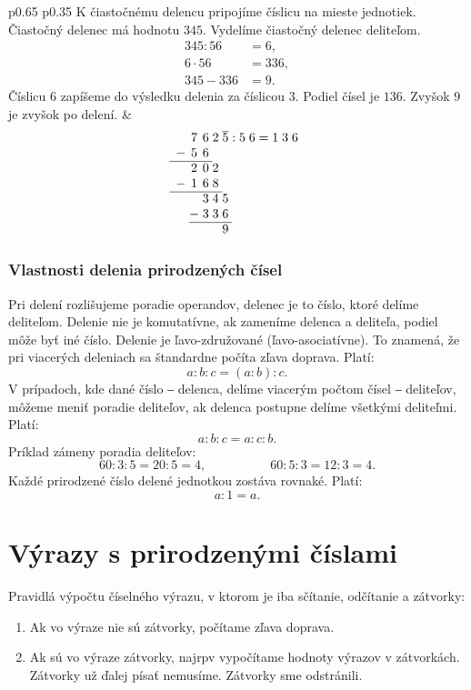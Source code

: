 \documentclass{report}
\begin{document}
\begin{longtable}{p{} p{}}
K čiastočnému delencu pripojíme číslicu na mieste jednotiek. Čiastočný delenec má hodnotu \(345\).
Vydelíme čiastočný delenec deliteľom.
\[
\begin{aligned}
  345 : 56 &= 6, \\
  6 \cdot 56 &= 336, \\
  345 - 336 &= 9.
\end{aligned}
\]
Číslicu \(6\) zapíšeme do výsledku delenia za číslicou \(3\).
Podiel čísel je \(136\). Zvyšok \(9\) je zvyšok po delení.
&
\[
\begin{array}{c@{\;}c@{\;}c@{\;}c@{\;}c@{\;}c@{\;}c@{\;}c@{\;}c@{\;}c@{\;}c@{\;}c}
    & 7 & 6 & 2 & \overline{5} & : & 5 & 6 & = & 1 & 3 & 6 \\
  - & 5 & 6 \\
  \cline{1-3}
    & 2 & 0 & 2 \\
  - & 1 & 6 & 8 \\
  \cline{1-4}
    &   & 3 & 4 & 5 \\
    & - & 3 & 3 & 6\\
  \cline{2-5}
    &   &   &   & 9
\end{array}
\]

\end{longtable}

\subsubsection{Vlastnosti delenia prirodzených čísel}

Pri delení rozlišujeme poradie operandov, delenec je to číslo, ktoré delíme deliteľom. Delenie nie je komutatívne, ak zameníme delenca a deliteľa, podiel môže byť iné číslo. Delenie je ľavo-združované (ľavo-asociatívne). To znamená, že pri viacerých deleniach sa štandardne počíta zľava doprava. Platí:
\[
a : b : c = (a : b) : c.
\]
V prípadoch, kde dané číslo ‒ delenca, delíme viacerým počtom čísel ‒ deliteľov, môžeme meniť poradie deliteľov, ak delenca postupne delíme všetkými deliteľmi. Platí:
\[
a : b : c = a : c : b.
\]
Príklad zámeny poradia deliteľov:
\[
60 : 3 : 5 = 20 : 5 = 4, \hspace{5em} 60 : 5 : 3 = 12 : 3 = 4.
\]
Každé prirodzené číslo delené jednotkou zostáva rovnaké. Platí:
\[
a : 1 = a.
\]

\section{Výrazy s prirodzenými číslami}

Pravidlá výpočtu číselného výrazu, v ktorom je iba sčítanie, odčítanie a zátvorky:
\begin{enumerate}[label=\arabic*)]
  \item Ak vo výraze nie sú zátvorky, počítame zľava doprava.
  \item Ak sú vo výraze zátvorky, najrpv vypočítame hodnoty výrazov v zátvorkách. Zátvorky už ďalej písať nemusíme. Zátvorky sme odstránili.
\end{enumerate}
\end{document}
